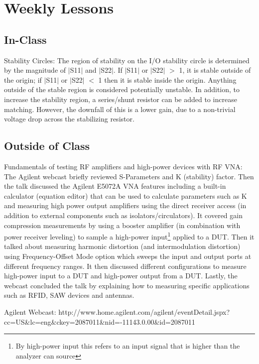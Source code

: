 \documentclass[conference]{IEEEtran}
\begin{document}
\section{Weekly Lessons}
\subsection{In-Class}
Stability Circles: The region of stability on the I/O stability circle is determined by the magnitude of $|$S11$|$ and $|$S22$|$.  If $|$S11$|$ or $|$S22$|$ $>$ 1, it is stable outside of the origin; if $|$S11$|$ or $|$S22$|$ $<$ 1 then it is stable inside the origin.  Anything outside of the stable region is considered potentially unstable.  In addition, to increase the stability region, a series/shunt resistor can be added to increase matching.  However, the downfall of this is a lower gain, due to a non-trivial voltage drop across the stabilizing resistor.
\subsection{Outside of Class}
Fundamentals of testing RF amplifiers and high-power devices with RF VNA\cite{agilent}: The Agilent webcast briefly reviewed S-Parameters and K (stability) factor.  Then the talk discussed the Agilent E5072A VNA features including a built-in calculator (equation editor) that can be used to calculate parameters such as K  and measuring high power output amplifiers using the direct receiver access (in addition to external components such as isolators/circulators).  It covered gain compression measurements by using a booster amplifier (in combination with power receiver leveling) to sample a high-power input\footnote{By high-power input this refers to an input signal that is higher than the analyzer can source} applied to a DUT.  Then it talked about measuring harmonic distortion (and intermodulation distortion) using Frequency-Offset Mode option which sweeps the input and output ports at different frequency ranges.  It then discussed different configurations to measure high-power input to a DUT and high-power output from a DUT.  Lastly, the webcast concluded the talk by explaining how to measuring specific applications such as RFID, SAW devices and antennas.
\begin{thebibliography}{1}
Agilent Webcast: http://www.home.agilent.com/agilent/eventDetail.jspx?\\cc=US\&lc=eng\&ckey=2087011\&nid=-11143.0.00\&id=2087011
\end{thebibliography}
\end{document}
